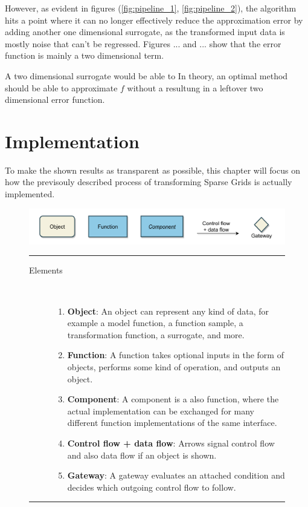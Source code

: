 \documentclass[
  a4paper,  %
  twoside,  %
  bibliography=totoc,
  headsepline,
  cleardoublepage=empty,
  parskip=half,
  draft=false
]{scrbook}
\newcommand{\delimit}{{\color{charcoal}\noindent\rule{\textwidth}{1pt}}}
\begin{document}
However, as evident in figures (\ref{fig:pipeline_1}, \ref{fig:pipeline_2}), the algorithm hits a point where it can no longer effectively reduce the approximation error by adding another one dimensional surrogate, as the transformed input data is mostly noise that can't be regressed.
Figures ... and ... show that the error function is mainly a two dimensional term.


A two dimensional surrogate would be able to 
In theory, an optimal method should be able to approximate $f$ without a resultung in a leftover two dimensional error function.

\chapter{Implementation}

To make the shown results as transparent as possible, this chapter will focus on how the previsouly described process of transforming Sparse Grids is actually implemented.


\begin{mdframed}[style=style,frametitle={Notation}]
\begin{figure}[H]


\includegraphics[width=\textwidth]{graphics/definitions.pdf}
\vspace{-7.5mm}

\delimit

\vspace{3.5mm}

\begin{description}
\item[Elements] {~ \begin{enumerate}[\indent{}]
\item \textbf{Object}: An object can represent any kind of data, for example a model function, a function sample, a transformation function, a surrogate, and more.
\item \textbf{Function}: A function takes optional inputs in the form of objects, performs some kind of operation, and outputs an object.
\item \textbf{Component}: A component is a also function, where the actual implementation can be exchanged for many different function implementations of the same interface.
\item \textbf{Control flow + data flow}: Arrows signal control flow and also data flow if an object is shown.
\item \textbf{Gateway}: A gateway evaluates an attached condition and decides which outgoing control flow to follow.
\end{enumerate}}
\end{description}

\delimit

\label{fig:defs}
\end{figure}
\end{mdframed}
\end{document}
